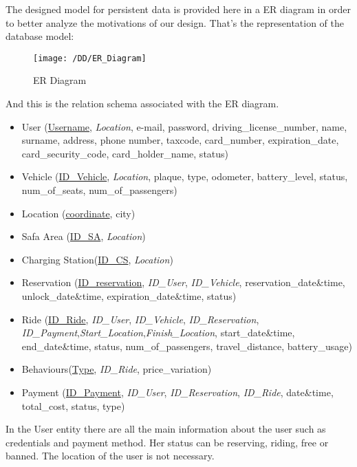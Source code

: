 The designed model for persistent data is provided here in a ER diagram in order to better analyze the motivations of our design. That's the representation of the database model:
\begin{figure}[!h]
  \centering
  \vspace{0.2cm}
  \texttt{[image: /DD/ER\_Diagram]}\\
  \vspace{0.4cm}
  \caption{ER Diagram} 
  \label{fig:ER_Diagram} 
\end{figure}

 And this is the relation schema associated with the ER diagram.
\begin{itemize} 
	\item{User (\underline{Username}, \textit{Location}, e-mail, password, driving\_license\_number, name, surname, address, phone number, taxcode, card\_number, expiration\_date, card\_security\_code, card\_holder\_name, status)} %
	\item{Vehicle (\underline{ID\_Vehicle}, \textit{Location}, plaque, type, odometer, battery\_level, status, num\_of\_seats, num\_of\_passengers) }
	\item{Location (\underline{coordinate}, city)}	
	\item{Safa Area (\underline{ID\_SA}, \textit{Location})} %
	\item{Charging Station(\underline{ID\_CS}, \textit{Location})}
	\item{Reservation (\underline{ID\_reservation}, \textit{ID\_User}, \textit{ID\_Vehicle}, reservation\_date\&time, unlock\_date\&time, expiration\_date\&time, status)}
	\item{Ride (\underline{ID\_Ride}, \textit{ID\_User}, \textit{ID\_Vehicle}, \textit{ID\_Reservation}, \textit{ID\_Payment},\textit{Start\_Location},\textit{Finish\_Location}, start\_date\&time, end\_date\&time, status, num\_of\_passengers, travel\_distance, battery\_usage)}
	\item{Behaviours(\underline{Type}, \textit{ID\_Ride}, price\_variation)}
	\item{Payment (\underline{ID\_Payment}, \textit{ID\_User}, \textit{ID\_Reservation}, \textit{ID\_Ride}, date\&time, total\_cost, status, type)}
\end{itemize}
In the User entity there are all the main information about the user such as credentials and payment method. Her status can be reserving, riding, free or banned. The location of the user is not necessary.
